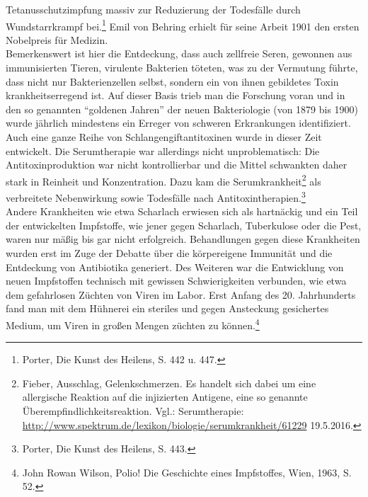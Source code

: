 \documentclass[
    a4paper,
    12pt,
    hyphens,
    chapterprefix=true,
    headheight=33pt,
    footheight=29pt,
    headings=optiontohead, %
]{scrartcl}
\begin{document}
Tetanusschutzimpfung massiv zur Reduzierung der Todesfälle durch Wundstarrkrampf bei.\footnote{Porter, Die Kunst des Heilens, 
S. 442 u. 447.} Emil von Behring erhielt für seine Arbeit 1901 den ersten Nobelpreis für Medizin.\\
Bemerkenswert ist hier die Entdeckung, dass auch zellfreie Seren, gewonnen aus immunisierten Tieren, virulente Bakterien töteten, was zu der Vermutung führte, dass nicht nur Bakterienzellen selbst, sondern ein von ihnen gebildetes Toxin krankheitserregend ist. Auf dieser Basis trieb man die Forschung voran und in den so genannten "`goldenen Jahren"' der neuen Bakteriologie (von 1879 bis 1900) wurde jährlich mindestens ein Erreger von schweren Erkrankungen identifiziert. Auch eine ganze Reihe von Schlangengiftantitoxinen wurde in dieser Zeit entwickelt. Die Serumtherapie war allerdings nicht unproblematisch: Die Antitoxinproduktion war nicht kontrollierbar 
und die Mittel schwankten daher stark in Reinheit und Konzentration. Dazu kam die Serumkrankheit\footnote{Fieber, Ausschlag, 
Gelenkschmerzen. Es handelt sich dabei um eine allergische Reaktion auf die injizierten Antigene, eine so genannte 
Überempfindlichkeitsreaktion. Vgl.: Serumtherapie: \url{http://www.spektrum.de/lexikon/biologie/serumkrankheit/61229} 19.5.2016.} 
als verbreitete Nebenwirkung sowie Todesfälle nach Antitoxintherapien.\footnote{Porter, Die Kunst des Heilens, S. 443.}\\
Andere Krankheiten wie etwa Scharlach erwiesen sich als hartnäckig und ein Teil der entwickelten Impfstoffe, wie jener gegen Scharlach, Tuberkulose oder die Pest, waren nur mäßig bis gar nicht erfolgreich. Behandlungen gegen diese Krankheiten wurden erst im Zuge der Debatte über die körpereigene Immunität und die Entdeckung von Antibiotika generiert. Des Weiteren war die Entwicklung von neuen Impfstoffen technisch mit gewissen Schwierigkeiten verbunden, wie etwa dem gefahrlosen Züchten von Viren im Labor. Erst Anfang des 20. Jahrhunderts fand man mit dem Hühnerei ein steriles und gegen Ansteckung gesichertes Medium, um Viren in großen Mengen züchten zu können.\footnote{John Rowan Wilson, Polio! Die Geschichte eines Impfstoffes, Wien, 1963, S. 52.}
\end{document}
